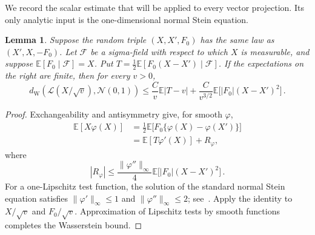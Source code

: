 \documentclass[11pt]{amsart}
\numberwithin{equation}{section}
\newtheorem{lemma}[theorem]{Lemma}
\theoremstyle{remark}
\newcommand{\E}{\mathbb E}
\newcommand{\Law}{\mathcal L}
\newcommand{\Normal}{\mathcal N}
\begin{document}
We record the scalar estimate that will be applied to every vector projection. Its only analytic input is the one-dimensional normal Stein equation.

\begin{lemma}\label{lem:stein-bound}
Suppose the random triple $(X,X',F_0)$ has the same law as $(X',X,-F_0)$. Let $\mathcal F$ be a sigma-field with respect to which $X$ is measurable, and suppose $\E[F_0\mid\mathcal F]=X$. Put $T=\tfrac12\E[F_0(X-X')\mid\mathcal F]$. If the expectations on the right are finite, then for every $v>0$,
\begin{equation}
 d_{\mathrm W}(\Law(X/\sqrt v),\Normal(0,1))
 \le\frac C v\E|T-v|
 +\frac C{v^{3/2}}\E\bigl[|F_0|(X-X')^2\bigr]\,.
 \label{eq:general-stein-bound}
\end{equation}
\end{lemma}
\begin{proof}
Exchangeability and antisymmetry give, for smooth $\varphi$,
\begin{align*}
 \E[X\varphi(X)]
 &=\frac12\E\bigl[F_0\{\varphi(X)-\varphi(X')\}\bigr]\\
 &=\E[T\varphi'(X)]+R_\varphi,
\end{align*}
where
\begin{equation*}
 |R_\varphi|\le\frac{\|\varphi''\|_\infty}{4}
 \E\bigl[|F_0|(X-X')^2\bigr]\,.
\end{equation*}
For a one-Lipschitz test function, the solution of the standard normal Stein equation satisfies $\|\varphi'\|_\infty\le1$ and $\|\varphi''\|_\infty\le2$; see~\cite[Lemma~4.2]{Chatterjee2008}. Apply the identity to $X/\sqrt v$ and $F_0/\sqrt v$. Approximation of Lipschitz tests by smooth functions completes the Wasserstein bound.
\end{proof}
\end{document}
